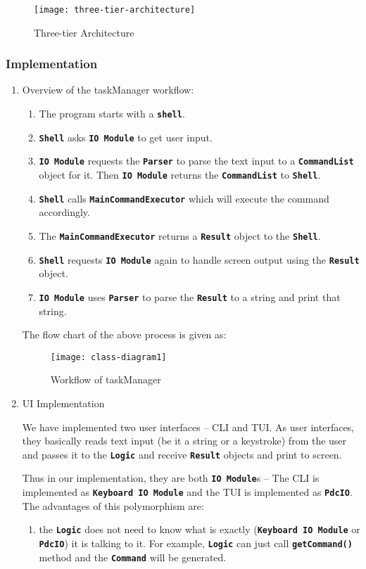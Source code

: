 \documentclass[12pt, a4paper]{article}
\newcommand{\cmdinline}[1]{{\bf \texttt{#1}}}
\begin{document}
\begin{figure}[h]
  \centering
  \texttt{[image: three-tier-architecture]}
  \caption{Three-tier Architecture}
\end{figure}

\subsubsection{Implementation}
\begin{enumerate}
\item  Overview of the taskManager workflow:
\begin{enumerate}
\item The program starts with a \cmdinline{shell}.
\item \cmdinline{Shell} asks \cmdinline{IO Module} to get user input.
\item \cmdinline{IO Module} requests the \cmdinline{Parser} to parse the text input to a \cmdinline{CommandList} object for it. Then \cmdinline{IO Module} returns the \cmdinline{CommandList} to \cmdinline{Shell}.
\item \cmdinline{Shell} calls \cmdinline{MainCommandExecutor} which will execute the command accordingly.
\item The \cmdinline{MainCommandExecutor} returns a \cmdinline{Result} object to the \cmdinline{Shell}.
\item \cmdinline{Shell} requests \cmdinline{IO Module} again to handle screen output using the \cmdinline{Result} object.
\item \cmdinline{IO Module} uses \cmdinline{Parser} to parse the \cmdinline{Result} to a string and print that string.
\end{enumerate}

The flow chart of the above process is given as:
\begin{figure}[h]
  \centering
  \texttt{[image: class-diagram1]}
  \caption{Workflow of taskManager}
\end{figure}

\newpage
\item UI Implementation

We have implemented two user interfaces -- CLI and TUI.
As user interfaces, they basically reads text input (be it a string or a keystroke) from the user and passes it to the \cmdinline{Logic} and receive \cmdinline{Result} objects and print to screen. 

Thus in our implementation, they are both \cmdinline{IO Module}s  -- The CLI is implemented as \cmdinline{Keyboard IO Module} and the TUI is implemented as \cmdinline{PdcIO}. The advantages of this polymorphism are:
\begin{enumerate}
\item the \cmdinline{Logic} does not need to know what is exactly (\cmdinline{Keyboard IO Module} or \cmdinline{PdcIO}) it is talking to it. For example, \cmdinline{Logic} can just call \cmdinline{getCommand()} method and the \cmdinline{Command} will be generated.


\end{enumerate}
\end{enumerate}
\end{document}
